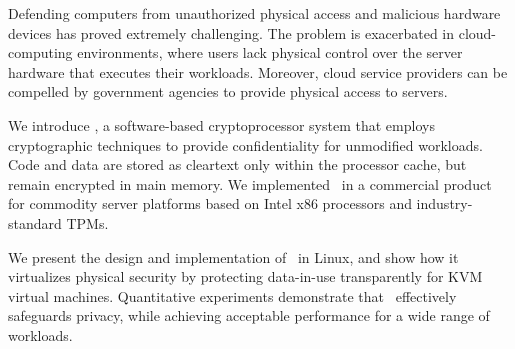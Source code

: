 \label{sec:abstract}

Defending computers from unauthorized physical access and malicious
hardware devices has proved extremely challenging.  The problem is
exacerbated in cloud-computing environments, where users lack physical
control over the server hardware that executes their workloads.
Moreover, cloud service providers can be compelled by government
agencies to provide physical access to servers.

We introduce {\em \vcage}, a software-based cryptoprocessor system
that employs cryptographic techniques to provide confidentiality for
unmodified workloads. Code and data are stored as cleartext only
within the processor cache, but remain encrypted in main memory.  We
implemented \vcage\ in a commercial product for commodity server
platforms based on Intel x86 processors and industry-standard TPMs.

We present the design and implementation of \vcage\ in Linux, and show
how it virtualizes physical security by protecting data-in-use
transparently for KVM virtual machines.  Quantitative experiments
demonstrate that \vcage\ effectively safeguards privacy, while
achieving acceptable performance for a wide range of workloads.

